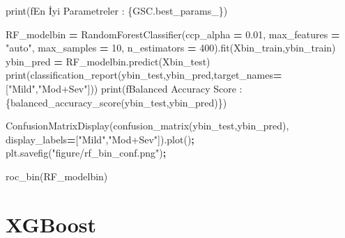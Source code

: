 \documentclass[12pt,twoside]{deuthesis}
\newenvironment{Shaded}{\begin{snugshade}}{\end{snugshade}}
\newcommand{\BuiltInTok}[1]{#1}
\newcommand{\DecValTok}[1]{\textcolor[rgb]{0.00,0.00,0.81}{#1}}
\newcommand{\FloatTok}[1]{\textcolor[rgb]{0.00,0.00,0.81}{#1}}
\newcommand{\NormalTok}[1]{#1}
\newcommand{\OperatorTok}[1]{\textcolor[rgb]{0.81,0.36,0.00}{\textbf{#1}}}
\newcommand{\SpecialCharTok}[1]{\textcolor[rgb]{0.00,0.00,0.00}{#1}}
\newcommand{\SpecialStringTok}[1]{\textcolor[rgb]{0.31,0.60,0.02}{#1}}
\newcommand{\StringTok}[1]{\textcolor[rgb]{0.31,0.60,0.02}{#1}}
\begin{document}
\begin{Shaded}
\begin{Highlighting}[]
\BuiltInTok{print}\NormalTok{(}\SpecialStringTok{f\textquotesingle{}En İyi Parametreler : }\SpecialCharTok{\{}\NormalTok{GSC}\SpecialCharTok{.}\NormalTok{best\_params\_}\SpecialCharTok{\}}\SpecialStringTok{\textquotesingle{}}\NormalTok{)}
\end{Highlighting}
\end{Shaded}
\begin{Shaded}
\begin{Highlighting}[]
\NormalTok{RF\_modelbin }\OperatorTok{=}\NormalTok{ RandomForestClassifier(ccp\_alpha }\OperatorTok{=} \FloatTok{0.01}\NormalTok{, }
\NormalTok{                                     max\_features }\OperatorTok{=} \StringTok{"auto"}\NormalTok{,}
\NormalTok{                                     max\_samples }\OperatorTok{=} \DecValTok{10}\NormalTok{,}
\NormalTok{                                     n\_estimators }\OperatorTok{=} \DecValTok{400}\NormalTok{).fit(Xbin\_train,ybin\_train)}
\NormalTok{ybin\_pred }\OperatorTok{=}\NormalTok{ RF\_modelbin.predict(Xbin\_test)}
\BuiltInTok{print}\NormalTok{(classification\_report(ybin\_test,ybin\_pred,target\_names}\OperatorTok{=}\NormalTok{[}\StringTok{"Mild"}\NormalTok{,}\StringTok{"Mod+Sev"}\NormalTok{]))}
\BuiltInTok{print}\NormalTok{(}\SpecialStringTok{f\textquotesingle{}Balanced Accuracy Score : }\SpecialCharTok{\{}\NormalTok{balanced\_accuracy\_score(ybin\_test,ybin\_pred)}\SpecialCharTok{\}}\SpecialStringTok{\textquotesingle{}}\NormalTok{)}
\end{Highlighting}
\end{Shaded}
\begin{Shaded}
\begin{Highlighting}[]
\NormalTok{ConfusionMatrixDisplay(confusion\_matrix(ybin\_test,ybin\_pred),}
\NormalTok{                       display\_labels}\OperatorTok{=}\NormalTok{[}\StringTok{"Mild"}\NormalTok{,}\StringTok{"Mod+Sev"}\NormalTok{]).plot()}\OperatorTok{;}
\NormalTok{plt.savefig(}\StringTok{"figure/rf\_bin\_conf.png"}\NormalTok{)}\OperatorTok{;}
\end{Highlighting}
\end{Shaded}
\begin{Shaded}
\begin{Highlighting}[]
\NormalTok{roc\_bin(RF\_modelbin)}
\end{Highlighting}
\end{Shaded}
\normalsize

\hypertarget{xgboost-2}{%
\section{XGBoost}\label{xgboost-2}}
\end{document}
